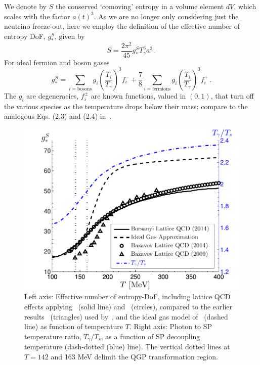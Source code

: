 We denote by $S$ the conserved `comoving' entropy in a volume element $dV$, which scales with the factor $a(t)^3$. As we are no longer only considering just the neutrino freeze-out, here we employ the definition of the effective number of entropy DoF, $g_*^S$, given by
\begin{equation}
S=\frac{2\pi^2}{45}g^S_*T_\gamma^3 a^3\,.
\end{equation} 
For ideal fermion and boson gases
\begin{equation}
g_*^S=\!\!\!\!\sum_{i=\text{bosons}}\!\!\!\!g_i \left(\frac{T_i}{T_\gamma}\right)^3\!\!\!f_i^-+\frac{7}{8}\!\!\!\sum_{i=\text{fermions}}\!\!\!\! g_i \left(\frac{T_i}{T_\gamma}\right)^3\!\!\!f_i^+\,.
\end{equation}
The $g_i$ are degeneracies, $f_i^\pm$ are known functions, valued in $(0,1)$, that turn off the various species as the temperature drops below their mass; compare to the analogous Eqs. (2.3) and (2.4) in~\cite{Blennow:2012de}. 


\begin{figure}
\centerline{\includegraphics[width=0.9\linewidth]{04-birrell/ModelIndStudy/Figures/gS_T_ratio.pdf}}
\caption{Left axis: Effective number of entropy-DoF, including lattice QCD effects applying~\cite{Borsanyi:2013bia} (solid line) and~\cite{HotQCD:2014kol} (circles), compared to the earlier results~\cite{Bazavov:2009zn} (triangles) used by~\cite{Anchordoqui:2011nh}, and the ideal gas model of~\cite{Coleman:2003hs} (dashed line) as function of temperature $T$. Right axis: Photon to SP temperature ratio, $T_\gamma/T_s$, as a function of SP decoupling temperature (dash-dotted (blue) line). The vertical dotted lines at $T=142$ and 163 MeV delimit the QGP transformation region. \label{fig:gS}}
 \end{figure}

